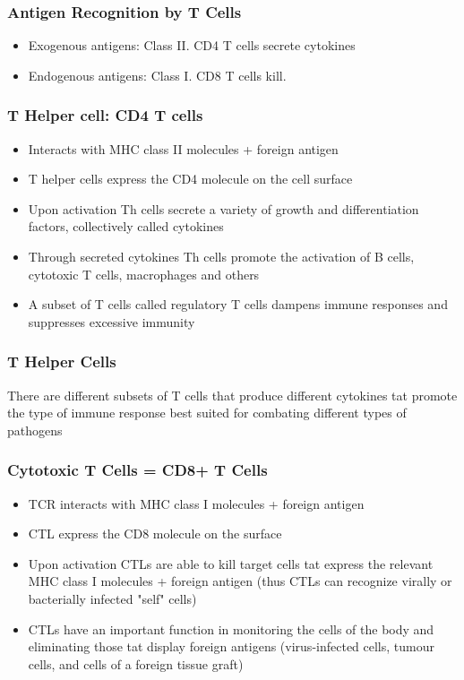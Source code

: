 \begin{itemize}
\begin{itemize}
\subsubsection{Antigen Recognition by T Cells}
\begin{itemize}
    \item Exogenous antigens: Class II. CD4 T cells secrete cytokines
    \item Endogenous antigens: Class I. CD8 T cells kill.
\end{itemize}
\subsubsection{T Helper cell: CD4 T cells}
\begin{itemize}
    \item Interacts with MHC class II molecules + foreign antigen
    \item T helper cells express the CD4 molecule on the cell surface
    \item Upon activation Th cells secrete a variety of growth and differentiation factors, collectively called cytokines
    \item Through secreted cytokines Th cells promote the activation of B cells, cytotoxic T cells, macrophages and others
    \item A subset of T cells called regulatory T cells dampens immune responses and suppresses excessive immunity

\end{itemize}
\subsubsection{T Helper Cells}
There are different subsets of T cells that produce different cytokines tat promote the type of immune response best suited for combating different types of pathogens

\subsubsection{Cytotoxic T Cells = CD8+ T Cells}
\begin{itemize}
    \item TCR interacts with MHC class I molecules + foreign antigen
    \item CTL express the CD8 molecule on the surface
    \item Upon activation CTLs are able to kill target cells tat express the relevant MHC class I molecules + foreign antigen (thus CTLs can recognize virally or bacterially infected "self" cells)
    \item CTLs have an important function in monitoring the cells of the body and eliminating those tat display foreign antigens (virus-infected cells, tumour cells, and cells of a foreign tissue graft)
\end{itemize}


\end{itemize}
\end{itemize}
